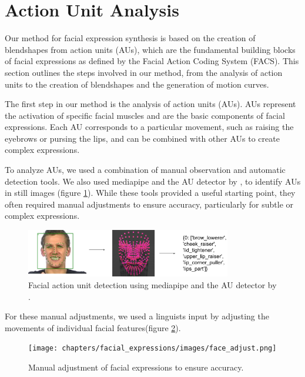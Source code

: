 \documentclass[../../main.tex]{subfiles}
\begin{document}
\section{Action Unit Analysis}
\label{ch:facial_expressions:action_unit_analysis}

Our method for facial expression synthesis is based on the creation of blendshapes from action units (AUs), which are the fundamental building blocks of facial expressions as defined by the Facial Action Coding System (FACS). This section outlines the steps involved in our method, from the analysis of action units to the creation of blendshapes and the generation of motion curves.

The first step in our method is the analysis of action units (AUs). AUs represent the activation of specific facial muscles and are the basic components of facial expressions. Each AU corresponds to a particular movement, such as raising the eyebrows or pursing the lips, and can be combined with other AUs to create complex expressions.

To analyze AUs, we used a combination of manual observation and automatic detection tools. We also used mediapipe and the AU detector by \cite{luo2022learning}, to identify AUs in still images (figure \ref{fig:face_detect}). While these tools provided a useful starting point, they often required manual adjustments to ensure accuracy, particularly for subtle or complex expressions.

\begin{figure}
    \centering
    \includegraphics[width=0.8\textwidth]{chapters/facial_expressions/images/face_detect.png}
    \caption{Facial action unit detection using mediapipe and the AU detector by \cite{luo2022learning}.}
    \label{fig:face_detect}
\end{figure}

For these manual adjustments, we used a linguists input by adjusting the movements of individual facial features(figure \ref{fig:face_adjust}).

\begin{figure}
    \centering
    \texttt{[image: chapters/facial\_expressions/images/face\_adjust.png]}
    \caption{Manual adjustment of facial expressions to ensure accuracy.}
    \label{fig:face_adjust}
\end{figure}
\end{document}
